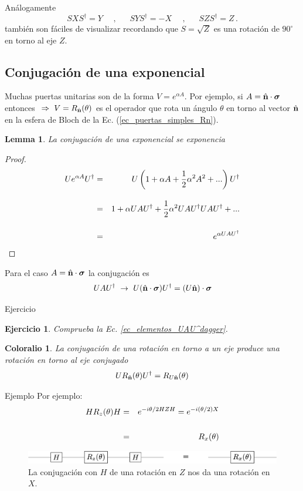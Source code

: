 \documentclass[a4paper,11pt]{book} %
\newtheorem{lemma_contador}{Lemma}
\newcommand{\Lemma}[1]{
		\begin{mybox_gray2}{}
			\begin{lemma_contador}
				 #1 
			\end{lemma_contador} 
		\end{mybox_gray2}
	}
\newtheorem{corolario_contador}{Coloralio}
\newcommand{\Corolario}[1]{
		\begin{mybox_gray2}{}
			\begin{corolario_contador}
				 #1 
			\end{corolario_contador} 
		\end{mybox_gray2}
	}
\newtheorem{ejercicio_contador}{Ejercicio}
\newcommand{\Ejercicio}[1]{
		\begin{mybox_gray}{Ejercicio} 
			\begin{ejercicio_contador}
				 #1 
			\end{ejercicio_contador} 
		\end{mybox_gray}
	}
\numberwithin{equation}{chapter}
\begin{document}
Análogamente
	\begin{equation*}
	S X S^\dagger  = Y ~~~~~~, ~~~~~~~ 
	S Y S^\dagger = -X ~~~~~~, ~~~~~~~ 
	S Z S^\dagger = Z \, .
	\end{equation*}
también  son fáciles de visualizar recordando que  $S=\sqrt{Z}$ es una rotación de $90^\circ$ en torno al eje $Z$.


        \subsection{Conjugación de una exponencial}

Muchas puertas unitarias son de la forma $V = e^{\alpha A}$. Por ejemplo, si  $A = \hat{\bf n}\cdot \boldsymbol{\sigma} $ entonces $  ~\Rightarrow ~V= R_{\hat{\bf n}}(\theta)$ es el operador que rota un ángulo $\theta$ en torno al vector $\hat{\bf n}$ en la esfera de Bloch de la Ec. (\ref{ec_puertas_simples_Rn}).

	\Lemma{La conjugación de una exponencial se exponencia}
	
	\begin{proof}
	\begin{eqnarray}
	U e^{\alpha A} U^\dagger &=&  U \left(1 + \alpha A  + \frac{1}{2} \alpha^2 A^2 + ... \right) U^\dagger \\ \rule{0mm}{8mm}
	&=& 1 + \alpha UAU^\dagger + \frac{1}{2}\alpha^2 UAU^\dagger U AU^\dagger + ... \\ \rule{0mm}{8mm}
	&=& e^{ \alpha UAU^\dagger} 
	\end{eqnarray}
	\end{proof}

Para el caso $A = \hat{\bf n}\cdot \boldsymbol{\sigma} $  la conjugación es
	\begin{equation} \label{ec_elementos_UAU^dagger}
	U A U^\dagger ~\to ~U (\hat{\bf n}\cdot \boldsymbol{\sigma} ) U^\dagger = (U\hat{\bf n})\cdot  \boldsymbol{\sigma}
	\end{equation}

	\Ejercicio{Comprueba la Ec. \ref{ec_elementos_UAU^dagger}.}

	\Corolario{La conjugación de una rotación en torno a un eje produce una rotación en torno al eje conjugado
	\begin{equation}
	U R_{\hat{\bf n}}(\theta) U^\dagger = R_{U\hat{\bf n}}(\theta)
	\end{equation}
	}
	
	\begin{mybox_green}{Ejemplo}
	Por ejemplo:
	\begin{eqnarray*}
	H R_z(\theta) H &=& e^{-i \theta/2 HZH} =  e^{-i (\theta/2) X} \\ \rule{0mm}{8mm}
	&=& R_x(\theta)
	\end{eqnarray*}
		\begin{figure}[H]
		\centering 
		\includegraphics[width=0.70\linewidth]{Figuras/Fig_elementos_HRzHconjugation}
		\caption{La conjugación con $H$ de una rotación en $Z$ nos da una rotación en $X$.}
		\label{Fig_elementos_HRzHconjugation}
		\end{figure}
	\end{mybox_green}
	
\end{document}
